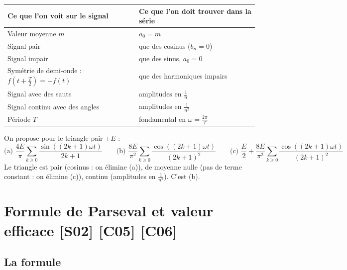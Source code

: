 \documentclass[a4paper,11pt]{article}
\begin{document}
\begin{methode}\label{meth:identifier}
\begin{center}
\renewcommand{\arraystretch}{1.35}
\begin{tabular}{|p{7.2cm}|p{7.6cm}|}
\hline
\rowcolor{uimmlightblue}
\textbf{Ce que l'on voit sur le signal} & \textbf{Ce que l'on doit trouver dans la série} \\
\hline
Valeur moyenne $m$ & $a_0 = m$ \\
\hline
Signal pair & que des cosinus ($b_n = 0$) \\
\hline
Signal impair & que des sinus, $a_0 = 0$ \\
\hline
Symétrie de demi-onde : $f(t+\frac T2) = -f(t)$ & que des harmoniques impairs \\
\hline
Signal avec des sauts & amplitudes en $\frac1n$ \\
\hline
Signal continu avec des angles & amplitudes en $\frac{1}{n^2}$ \\
\hline
Période $T$ & fondamental en $\omega = \frac{2\pi}{T}$ \\
\hline
\end{tabular}
\end{center}
\end{methode}

\begin{exemple}\label{ex:identifier}
On propose pour le triangle pair $\pm E$ :
\[
\text{(a) } \frac{4E}{\pi}\sum_{k\geq0}\frac{\sin((2k+1)\omega t)}{2k+1}
\qquad
\text{(b) } \frac{8E}{\pi^2}\sum_{k\geq0}\frac{\cos((2k+1)\omega t)}{(2k+1)^2}
\qquad
\text{(c) } \frac E2 + \frac{8E}{\pi^2}\sum_{k\geq0}\frac{\cos((2k+1)\omega t)}{(2k+1)^2}
\]
Le triangle est pair (cosinus : on élimine (a)), de moyenne nulle (pas de terme constant : on élimine (c)), continu (amplitudes en $\frac{1}{n^2}$). C'est (b).
\end{exemple}

\needspace{7cm}
\section{Formule de Parseval et valeur efficace \hfill {\normalsize\color{uimmred}[S02] [C05] [C06]}}\label{sec:parseval}

\subsection{La formule}\label{subsec:formule}
\end{document}
